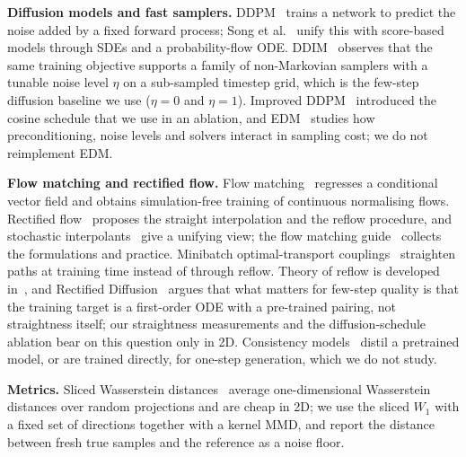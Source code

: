 \textbf{Diffusion models and fast samplers.} DDPM~\cite{ho2020denoising} trains a network to predict the noise added by a fixed forward process; Song et al.~\cite{song2020score} unify this with score-based models through SDEs and a probability-flow ODE. DDIM~\cite{song2020denoising} observes that the same training objective supports a family of non-Markovian samplers with a tunable noise level $\eta$ on a sub-sampled timestep grid, which is the few-step diffusion baseline we use ($\eta{=}0$ and $\eta{=}1$). Improved DDPM~\cite{nichol2021improved} introduced the cosine schedule that we use in an ablation, and EDM~\cite{karras2022elucidating} studies how preconditioning, noise levels and solvers interact in sampling cost; we do not reimplement EDM.

\textbf{Flow matching and rectified flow.} Flow matching~\cite{lipman2022flow} regresses a conditional vector field and obtains simulation-free training of continuous normalising flows. Rectified flow~\cite{liu2022flow} proposes the straight interpolation and the reflow procedure, and stochastic interpolants~\cite{albergo2022building} give a unifying view; the flow matching guide~\cite{lipman2024flow} collects the formulations and practice. Minibatch optimal-transport couplings~\cite{tong2023improving} straighten paths at training time instead of through reflow. Theory of reflow is developed in~\cite{bansal2024convergence}, and Rectified Diffusion~\cite{wang2024rectified} argues that what matters for few-step quality is that the training target is a first-order ODE with a pre-trained pairing, not straightness itself; our straightness measurements and the diffusion-schedule ablation bear on this question only in 2D. Consistency models~\cite{song2023consistency} distil a pretrained model, or are trained directly, for one-step generation, which we do not study.

\textbf{Metrics.} Sliced Wasserstein distances~\cite{bonneel2015sliced,kolouri2019generalized} average one-dimensional Wasserstein distances over random projections and are cheap in 2D; we use the sliced $W_1$ with a fixed set of directions together with a kernel MMD, and report the distance between fresh true samples and the reference as a noise floor.
